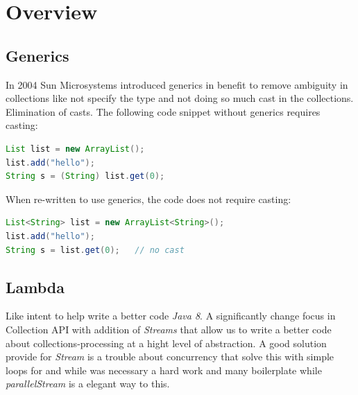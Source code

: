 \documentclass{sig-alternate-05-2015}
\begin{document}


\section{Overview}

\subsection{Generics}
In 2004 Sun Microsystems introduced generics in benefit to remove ambiguity in collections like not specify the type and not doing so much cast in the collections.
Elimination of casts. The following code snippet without generics requires casting:

\begin{lstlisting}[language=java]
List list = new ArrayList();
list.add("hello");
String s = (String) list.get(0);
\end{lstlisting}

When re-written to use generics, the code does not require casting:

\begin{lstlisting}[language=java]
List<String> list = new ArrayList<String>();
list.add("hello");
String s = list.get(0);   // no cast
\end{lstlisting}

\subsection{Lambda}
	Like intent to help write a better code \textit{Java 8}. A significantly change focus in Collection API with addition of \textit{Streams} that allow us to write a better code about collections-processing at a hight level of abstraction. A good solution provide for \textit{Stream} is a trouble about concurrency that solve this with simple loops for and while was necessary a hard work and many boilerplate while \textit{parallelStream} is a elegant way to this.\\
	
\end{document}

